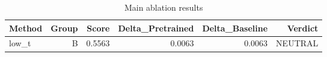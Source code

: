 \begin{table}[htbp]
\centering
\caption{Main ablation results}
\label{tab:main-results}
\begin{tabular}{lrrrrr}
\toprule
\textbf{Method} & \textbf{Group} & \textbf{Score} & \textbf{Delta\_Pretrained} & \textbf{Delta\_Baseline} & \textbf{Verdict} \\
\midrule
low\_t & B & 0.5563 & 0.0063 & 0.0063 & NEUTRAL \\
\bottomrule
\end{tabular}
\end{table}